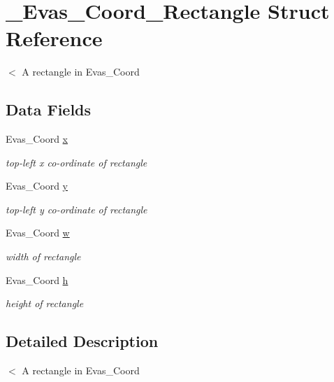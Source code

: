 \section{\_\-Evas\_\-Coord\_\-Rectangle Struct Reference}
\label{struct__Evas__Coord__Rectangle}


$<$ A rectangle in Evas\_\-Coord  


\subsection*{Data Fields}
\begin{DoxyCompactItemize}
\item 
Evas\_\-Coord \hyperlink{struct__Evas__Coord__Rectangle_a8281ece9529d16c84be8b388ea5ae983}{x}\label{struct__Evas__Coord__Rectangle_a8281ece9529d16c84be8b388ea5ae983}

\begin{DoxyCompactList}\small\item\em top-\/left x co-\/ordinate of rectangle \item\end{DoxyCompactList}\item 
Evas\_\-Coord \hyperlink{struct__Evas__Coord__Rectangle_adafcf87056501a29d628801e8cacd0d5}{y}\label{struct__Evas__Coord__Rectangle_adafcf87056501a29d628801e8cacd0d5}

\begin{DoxyCompactList}\small\item\em top-\/left y co-\/ordinate of rectangle \item\end{DoxyCompactList}\item 
Evas\_\-Coord \hyperlink{struct__Evas__Coord__Rectangle_a5a72fe41e483e3fcaefa1ee2fdd2f925}{w}\label{struct__Evas__Coord__Rectangle_a5a72fe41e483e3fcaefa1ee2fdd2f925}

\begin{DoxyCompactList}\small\item\em width of rectangle \item\end{DoxyCompactList}\item 
Evas\_\-Coord \hyperlink{struct__Evas__Coord__Rectangle_afb6159a85268fc627520a3436cf94a7a}{h}\label{struct__Evas__Coord__Rectangle_afb6159a85268fc627520a3436cf94a7a}

\begin{DoxyCompactList}\small\item\em height of rectangle \item\end{DoxyCompactList}\end{DoxyCompactItemize}


\subsection{Detailed Description}
$<$ A rectangle in Evas\_\-Coord 